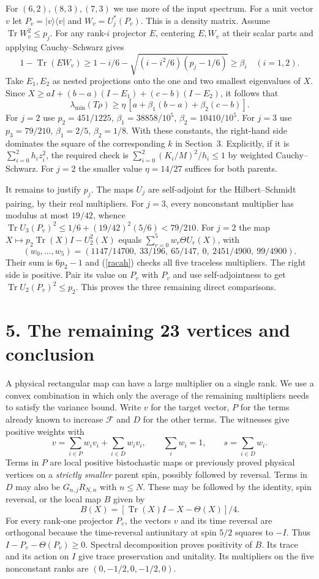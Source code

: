 \documentclass[11pt,a4paper]{article}
\newcommand{\Tr}{\operatorname{Tr}}
\newcommand{\F}{\mathcal F}
\begin{document}
For $(6,2),(8,3),(7,3)$ we use more of the input spectrum. For a unit vector $v$ let $P_v=|v\rangle\langle v|$ and $W_v=U_j^*(P_v)$. This is a density matrix. Assume $\Tr W_v^2\le p_j$. For any rank-$i$ projector $E$, centering $E,W_v$ at their scalar parts and applying Cauchy--Schwarz gives
\[
 1-\Tr(EW_v)\ge1-i/6-\sqrt{(i-i^2/6)(p_j-1/6)}\ge\beta_i\quad (i=1,2).
\]
Take $E_1,E_2$ as nested projections onto the one and two smallest eigenvalues of $X$. Since $X\ge aI+(b-a)(I-E_1)+(c-b)(I-E_2)$, it follows that
\[
 \lambda_{\min}(T\rho)\ge\eta\,[a+\beta_1(b-a)+\beta_2(c-b)].
\]
For $j=2$ use $p_2=451/1225$, $\beta_1=38858/10^5$, $\beta_2=10410/10^5$. For $j=3$ use $p_3=79/210$, $\beta_1=2/5$, $\beta_2=1/8$. With these constants, the right-hand side dominates the square of the corresponding $k$ in Section~3. Explicitly, if it is $\sum_{i=0}^2 h_i z_i^2$, the required check is $\sum_{i=0}^2 (K_i/M)^2/h_i\le1$ by weighted Cauchy--Schwarz. For $j=2$ the smaller value $\eta=14/27$ suffices for both parents.

It remains to justify $p_j$. The maps $U_j$ are self-adjoint for the Hilbert--Schmidt pairing, by their real multipliers. For $j=3$, every nonconstant multiplier has modulus at most $19/42$, whence $\Tr U_3(P_v)^2\le 1/6+(19/42)^2(5/6)<79/210$. For $j=2$ the map $X\mapsto p_2\Tr(X)I-U_2^2(X)$ equals $\sum_{r=0}^5 w_r\Theta U_r(X)$, with
\[
 (w_0,\ldots,w_5)=
 (1147/14700,\ 33/196,\ 65/147,\ 0,\ 2451/4900,\ 99/4900).
\]
Their sum is $6p_2-1$ and (\ref{racah}) checks all five traceless multipliers. The right side is positive. Pair its value on $P_v$ with $P_v$ and use self-adjointness to get $\Tr U_2(P_v)^2\le p_2$. This proves the three remaining direct comparisons.
\newpage
\section*{5. The remaining 23 vertices and conclusion}
A physical rectangular map can have a large multiplier on a single rank. We use a convex combination in which only the average of the remaining multipliers needs to satisfy the variance bound. Write $v$ for the target vector, $P$ for the terms already known to increase $\F$ and $D$ for the other terms. The witnesses give positive weights with
\[
 v=\sum_{i\in P}w_i v_i+\sum_{i\in D}w_i v_i,\qquad \sum_iw_i=1,\qquad s=\sum_{i\in D}w_i.
\]
Terms in $P$ are local positive bistochastic maps or previously proved physical vertices on a \emph{strictly smaller} parent spin, possibly followed by reversal. Terms in $D$ may also be $G_{n,j}R_{N,n}$ with $n\le N$. These may be followed by the identity, spin reversal, or the local map $B$ given by
\[
 B(X)=[\Tr(X)I-X-\Theta(X)]/4.
\]
For every rank-one projector $P_v$, the vectors $v$ and its time reversal are orthogonal because the time-reversal antiunitary at spin $5/2$ squares to $-I$. Thus $I-P_v-\Theta(P_v)\ge0$. Spectral decomposition proves positivity of $B$. Its trace and its action on $I$ give trace preservation and unitality. Its multipliers on the five nonconstant ranks are $(0,-1/2,0,-1/2,0)$.
\end{document}
